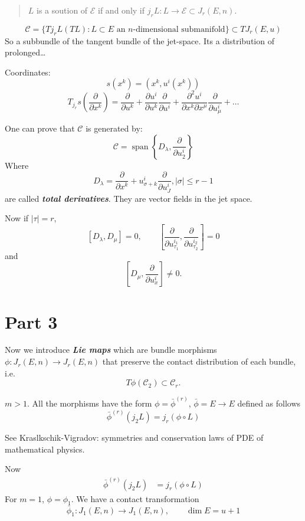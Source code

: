  \begin{quotation}
 	$L$ is a soution of $\mathcal{E}$ if and only if $j_rL:L \to \mathcal{E} \subset J_r(E,n)$.
 \end{quotation}
 
\[\mathcal{C}=\{Tj_rL(TL):L \subset E \text{ an $n$-dimensional submanifold} \}\subset T J_r(E,u)\]
So a subbundle of the tangent bundle of the jet-space. Its a distribution of prolonged…

Coordinates: 
\[s(x^k)=(x^k, u^i(x^k))\]
\[T_{j_r}s\left( \frac{\partial }{\partial x^k} \right) =\frac{\partial }{\partial u^k}+\frac{\partial u^i}{\partial u^k}\frac{\partial }{\partial u^i}+\frac{\partial^2 u^i}{\partial x^k \partial x^\mu}\frac{\partial }{\partial u^i_\mu}+\ldots\]

One can prove that $\mathcal{C}$ is generated by:
\[\mathcal{C}=\operatorname{s p a n}\left\{ D_\lambda ,\frac{\partial }{\partial u^i_2}\right\}\]
Where
\[D_\lambda=\frac{\partial }{\partial x^k}+u^i_{\sigma+k}\frac{\partial }{\partial u^i_J},|\sigma|\leq r-1 \]
are called \textit{\textbf{total derivatives}}. They are vector fields in the jet space.
 
Now if $|\tau|=r$,
\[[D_\lambda,D_\mu]=0,\qquad \left[ \frac{\partial }{\partial u^{i_1}_{\tau_1}},\frac{\partial }{\partial u^{i_2}_{\tau_2}} \right] =0\]
and
\[\left[ D_\mu,\frac{\partial }{\partial u^i_x} \right] \neq 0.\]

\section{Part 3}

Now we introduce \textit{\textbf{Lie maps}} which are bundle morphisms  $\phi:J_r(E,n) \to J_r(E,n)$ that preserve the contact distribution of each bundle, i.e.
 \[T\phi(\mathcal{C}_2)\subset \mathcal{C}_r.\]

 \begin{thm}\leavevmode
 $m>1$. All the morphisms have the form $\phi=\bar{\phi}^{(r)}$, $\bar{\phi} =E \to E$ defined as follows
 \[\bar{\phi}^{(r)}(j_2L)=j_r(\phi \circ L)\]
 \end{thm}

See Kraslkschik-Vigradov: symmetries  and conservation laws of PDE of mathematical physics.

Now
\begin{align*}
\bar{\phi}^{(r)}(j_2L)&=j_r(\phi \circ L)
\end{align*}
For $m=1$, $\phi=\phi_1$. We have a contact transformation
\[\bar{\phi}_1:J_1(E,n) \longrightarrow J_1(E,n),\qquad  \dim E= u+1\]


